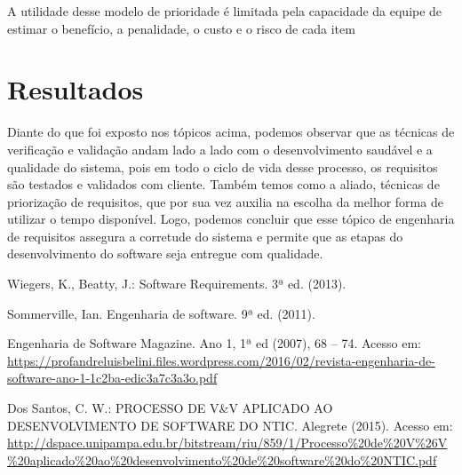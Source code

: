 \documentclass[runningheads]{llncs}
\begin{document}
A utilidade desse modelo de prioridade é limitada pela capacidade da equipe de estimar o benefício, a penalidade, o custo e o risco de cada item

\section{Resultados}
Diante do que foi exposto nos tópicos acima, podemos observar que as técnicas de verificação e validação andam lado a lado com o desenvolvimento saudável e a qualidade do sistema, pois em todo o ciclo de vida desse processo, os requisitos são testados e validados com cliente. Também temos como a aliado, técnicas de priorização de requisitos, que por sua vez auxilia na escolha da melhor forma de utilizar o tempo disponível. Logo, podemos concluir que esse tópico de engenharia de requisitos assegura a corretude do sistema e permite que as etapas do desenvolvimento do software seja entregue com qualidade.




%
%
%
% 
%

\begin{thebibliography}{}
Wiegers, K., Beatty, J.: Software Requirements. 3ª ed. (2013).

Sommerville, Ian. Engenharia de software. 9ª ed. (2011).

Engenharia de Software Magazine. Ano 1, 1ª ed (2007), 68 -- 74. Acesso em: \url{https://profandreluisbelini.files.wordpress.com/2016/02/revista-engenharia-de-software-ano-1-1c2ba-edic3a7c3a3o.pdf}

Dos Santos, C. W.: PROCESSO DE V&V APLICADO AO DESENVOLVIMENTO DE SOFTWARE DO NTIC. Alegrete (2015). Acesso em: \url{http://dspace.unipampa.edu.br/bitstream/riu/859/1/Processo\%20de\%20V\%26V\%20aplicado\%20ao\%20desenvolvimento\%20de\%20software\%20do\%20NTIC.pdf}

\end{thebibliography}
\end{document}
